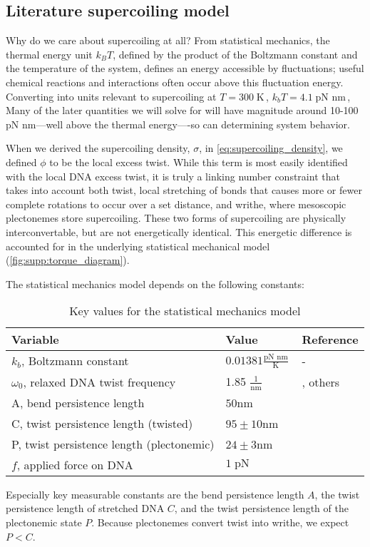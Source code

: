 \documentclass[11pt]{article} %
\newcommand{\units}[2]{\frac{\text{#1}}{\text{#2}}\,}
\newcommand{\unit}[1]{\; \text{#1}\,}
\begin{document}
\subsection{Literature supercoiling model}
Why do we care about supercoiling at all? From statistical mechanics, the thermal energy unit \(k_B T\), defined by the product of the Boltzmann constant and the temperature of the system, defines an energy accessible by fluctuations; useful chemical reactions and interactions often occur above this fluctuation energy. Converting into units relevant to supercoiling at \(T = 300 \unit{K}\), \(k_b T = 4.1 \unit{pN nm}\),  Many of the later quantities we will solve for will have magnitude around 10-100 pN nm---well above the thermal energy----so can determining system behavior.

When we derived the supercoiling density, \(\sigma\), in \cref{eq:supercoiling_density}, we defined \(\phi\) to be the local excess twist. While this term is most easily identified with the local DNA excess twist, it is truly a linking number constraint that takes into account both twist, local stretching of bonds that causes more or fewer complete rotations to occur over a set distance, and writhe, where mesoscopic plectonemes store supercoiling. These two forms of supercoiling are physically interconvertable, but are not energetically identical. This energetic difference is accounted for in the underlying statistical mechanical model (\cref{fig:supp:torque_diagram}).

The statistical mechanics model depends on the following constants:
\begin{table}[h]
    \centering
    \begin{tabular}{@{}lll@{}}
        \toprule
        Variable & Value & Reference \\
        \midrule
        \(k_b\), Boltzmann constant & \(0.01381 \units{pN nm}{K}\) & - \\
        \(\omega_0\), relaxed DNA twist frequency & 1.85 \(\units{1}{nm}\) & \parencite{sevierPropertiesGeneExpression2018}, others \\
        \midrule
        A, bend persistence length & \(50\)nm & \parencite{markoTorqueDynamicsLinking2007} \\
        C, twist persistence length (twisted) & \(95 \pm 10\)nm & \parencite{markoTorqueDynamicsLinking2007} \\
        P, twist persistence length (plectonemic) & \(24 \pm 3\)nm & \parencite{markoTorqueDynamicsLinking2007} \\
        \(f\), applied force on DNA & \(1 \unit{pN}\) & \parencite{sevierPropertiesGeneExpression2018} \\
        \bottomrule
    \end{tabular}
    \caption{Key values for the statistical mechanics model}
    \label{tab:constants}
\end{table}
\FloatBarrier
Especially key measurable constants are the bend persistence length \(A\), the twist persistence length of stretched DNA \(C\), and the twist persistence length of the plectonemic
state \(P\). Because plectonemes convert twist into writhe, we expect \(P < C\).
\end{document}
